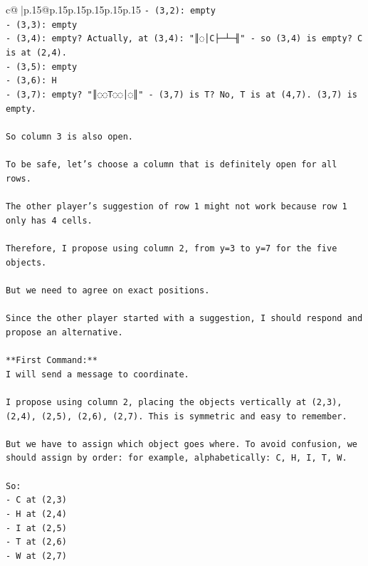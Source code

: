 \documentclass{article}
\begin{document}
{\begin{supertabular}{c@{$\;$}|p{.15\linewidth}@{}p{.15\linewidth}p{.15\linewidth}p{.15\linewidth}p{.15\linewidth}p{.15\linewidth}}
{{{\texttt{{-} (3,2): empty} \\
\texttt{{-} (3,3): empty} \\
\texttt{{-} (3,4): empty? Actually, at (3,4): "║◌│C├─┴─╢" {-} so (3,4) is empty? C is at (2,4).} \\
\texttt{{-} (3,5): empty} \\
\texttt{{-} (3,6): H} \\
\texttt{{-} (3,7): empty? "║◌◌T◌◌│◌║" {-} (3,7) is T? No, T is at (4,7). (3,7) is empty.} \\
\\ 
\texttt{So column 3 is also open.} \\
\\ 
\texttt{To be safe, let's choose a column that is definitely open for all rows.} \\
\\ 
\texttt{The other player's suggestion of row 1 might not work because row 1 only has 4 cells.} \\
\\ 
\texttt{Therefore, I propose using column 2, from y=3 to y=7 for the five objects.} \\
\\ 
\texttt{But we need to agree on exact positions.} \\
\\ 
\texttt{Since the other player started with a suggestion, I should respond and propose an alternative.} \\
\\ 
\texttt{**First Command:**} \\
\texttt{I will send a message to coordinate.} \\
\\ 
\texttt{I propose using column 2, placing the objects vertically at (2,3), (2,4), (2,5), (2,6), (2,7). This is symmetric and easy to remember.} \\
\\ 
\texttt{But we have to assign which object goes where. To avoid confusion, we should assign by order: for example, alphabetically: C, H, I, T, W.} \\
\\ 
\texttt{So:} \\
\texttt{{-} C at (2,3)} \\
\texttt{{-} H at (2,4)} \\
\texttt{{-} I at (2,5)} \\
\texttt{{-} T at (2,6)} \\
\texttt{{-} W at (2,7)} \\
}}}
\end{supertabular}}
\end{document}
